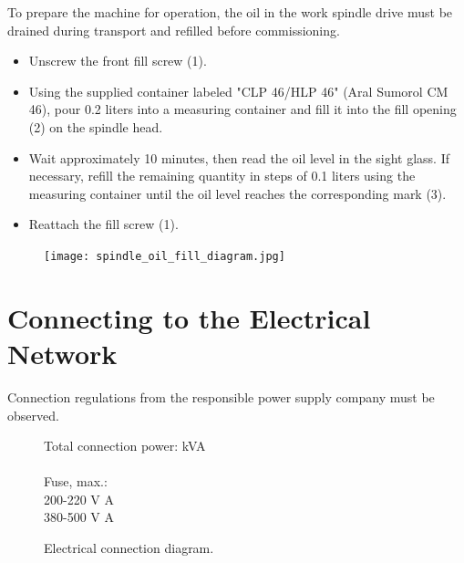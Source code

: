 To prepare the machine for operation, the oil in the work spindle drive must be drained during transport and refilled before commissioning.

\vspace{.5cm}



\begin{itemize}[itemsep=0.5em]
    \item Unscrew the front fill screw (1).
    \item Using the supplied container labeled "CLP 46/HLP 46" (Aral Sumorol CM 46), pour 0.2 liters into a measuring container and fill it into the fill opening (2) on the spindle head.
    \item Wait approximately 10 minutes, then read the oil level in the sight glass. If necessary, refill the remaining quantity in steps of 0.1 liters using the measuring container until the oil level reaches the corresponding mark (3).
    \item Reattach the fill screw (1).
\end{itemize}

\begin{figure}[h!]
    \centering
    \texttt{[image: spindle\_oil\_fill\_diagram.jpg]} %
    \caption{}
\end{figure}


\section{Connecting to the Electrical Network}

\noindent
Connection regulations from the responsible power supply company must be observed.

\noindent
\begin{figure}[htp] %
    \centering
    \begin{minipage}[t]{.4\linewidth} %
        \centering
        \caption{Electrical connection diagram.} %
        \label{fig:electrical_connection} %
    \end{minipage}%
    \hfill %
    \begin{minipage}[t]{\dimexpr\textwidth-8cm\relax} %
        \vspace{0pt} %
        Total connection power:  kVA \\\\
        Fuse, max.: \\
        200-220 V  A \\
        380-500 V  A
    \end{minipage}
\end{figure}

